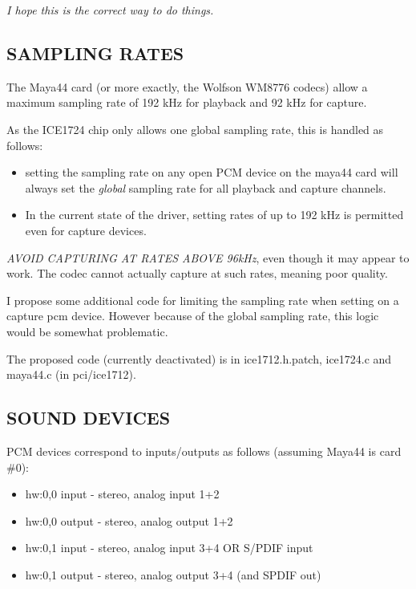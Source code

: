 \documentclass[a4paper,8pt,english]{sphinxmanual}
\begin{document}
\emph{I hope this is the correct way to do things.}


\subsection{SAMPLING RATES}
\label{sound/cards/maya44:sampling-rates}
The Maya44 card (or more exactly, the Wolfson WM8776 codecs) allow a maximum sampling rate of 192 kHz for playback and 92 kHz for capture.

As the ICE1724 chip only allows one global sampling rate, this is handled as follows:
\begin{itemize}
\item {} 
setting the sampling rate on any open PCM device on the maya44 card will always set the \emph{global} sampling rate for all playback and capture channels.

\item {} 
In the current state of the driver, setting rates of up to 192 kHz is permitted even for capture devices.

\end{itemize}

\emph{AVOID CAPTURING AT RATES ABOVE 96kHz}, even though it may appear to work. The codec cannot actually capture at such rates, meaning poor quality.

I propose some additional code for limiting the sampling rate when setting on a capture pcm device. However because of the global sampling rate, this logic would be somewhat problematic.

The proposed code (currently deactivated) is in ice1712.h.patch, ice1724.c and maya44.c (in pci/ice1712).


\subsection{SOUND DEVICES}
\label{sound/cards/maya44:sound-devices}
PCM devices correspond to inputs/outputs as follows (assuming Maya44 is card \#0):
\begin{itemize}
\item {} 
hw:0,0 input - stereo, analog input 1+2

\item {} 
hw:0,0 output - stereo, analog output 1+2

\item {} 
hw:0,1 input - stereo, analog input 3+4 OR S/PDIF input

\item {} 
hw:0,1 output - stereo, analog output 3+4 (and SPDIF out)

\end{itemize}
\end{document}
